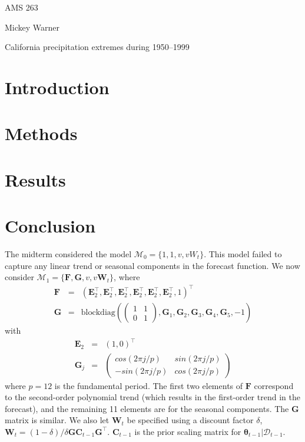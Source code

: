 \documentclass[12pt]{article}
\newcommand{\m}[1]{\mathbf{\bm{#1}}}
\begin{document}
\noindent AMS 263

\noindent Mickey Warner
\bigskip

\begin{center}
\begin{large}
California precipitation extremes during 1950--1999
\end{large}
\end{center}

\section*{Introduction}

\section*{Methods}

\section*{Results}

\section*{Conclusion}


\noindent The midterm considered the model $\mathcal{M}_0=\{1,1,v,vW_t\}$. This model failed to capture any linear trend or seasonal components in the forecast function. We now consider $\mathcal{M}_1=\{\m{F}, \m{G}, v, v\m{W}_t\}$, where
\begin{eqnarray*}
\m{F} &=& (\m{E}_2^\top, \m{E}_2^\top, \m{E}_2^\top, \m{E}_2^\top, \m{E}_2^\top, \m{E}_2^\top, 1)^\top \\
\m{G} &=& \mathrm{blockdiag}\left(\left(\begin{array}{cc} 1 & 1 \\ 0 & 1 \end{array} \right), \m{G}_1, \m{G}_2, \m{G}_3, \m{G}_4, \m{G}_5, -1 \right)
\end{eqnarray*}
\noindent with
\begin{eqnarray*}
\m{E}_2 &=& (1, 0)^\top \\
\m{G}_j &=& \left(\begin{array}{cc} cos(2\pi j/p) & sin(2\pi j/p) \\ -sin(2\pi j/p) & cos(2\pi j/p) \end{array}\right)
\end{eqnarray*}
\noindent where $p=12$ is the fundamental period. The first two elements of $\m{F}$ correspond to the second-order polynomial trend (which results in the first-order trend in the forecast), and the remaining 11 elements are for the seasonal components. The $\m{G}$ matrix is similar. We also let $\m{W}_t$ be specified using a discount factor $\delta$, $\m{W}_t=(1-\delta)/\delta\m{G}\m{C}_{t-1}\m{G}^\top$. $\m{C}_{t-1}$ is the prior scaling matrix for $\m{\theta}_{t-1}|\mathcal{D}_{t-1}$.
\bigskip
\end{document}
